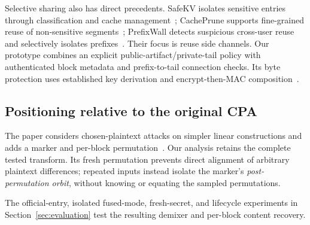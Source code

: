 Selective sharing also has direct precedents. SafeKV isolates sensitive entries through classification and cache management~\cite{safekv}; CachePrune supports fine-grained reuse of non-sensitive segments~\cite{cacheprune}; PrefixWall detects suspicious cross-user reuse and selectively isolates prefixes~\cite{prefixwall}. Their focus is reuse side channels. Our prototype combines an explicit public-artifact/private-tail policy with authenticated block metadata and prefix-to-tail connection checks. Its byte protection uses established key derivation and encrypt-then-MAC composition~\cite{hkdf,etm}.

\subsection{Positioning relative to the original CPA}
The \scheme{} paper considers chosen-plaintext attacks on simpler linear constructions and adds a marker and per-block permutation~\cite{kvcloak}. Our analysis retains the complete tested transform. Its fresh permutation prevents direct alignment of arbitrary plaintext differences; repeated inputs instead isolate the marker's \emph{post-permutation orbit}, without knowing or equating the sampled permutations.

The official-entry, isolated fused-mode, fresh-secret, and lifecycle experiments in Section~\ref{sec:evaluation} test the resulting demixer and per-block content recovery.
